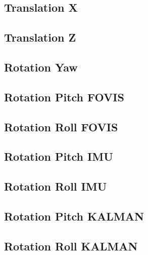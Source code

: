 \subsection{Translation X}

\subsection{Translation Z}

\subsection{Rotation Yaw}

\subsection{Rotation Pitch FOVIS}

\subsection{Rotation Roll FOVIS}

\subsection{Rotation Pitch IMU}

\subsection{Rotation Roll IMU}

\subsection{Rotation Pitch KALMAN}

\subsection{Rotation Roll KALMAN}



